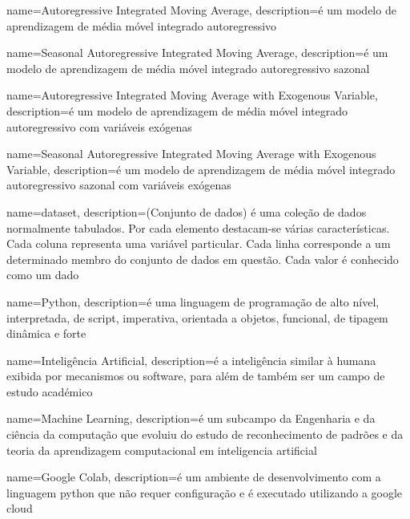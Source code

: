 {
    name={Autoregressive Integrated Moving Average},
    description={é um modelo de aprendizagem de média móvel integrado autoregressivo}
}

{
    name={Seasonal Autoregressive Integrated Moving Average},
    description={é um modelo de aprendizagem de média móvel integrado autoregressivo
    sazonal}
}

{
    name={Autoregressive Integrated Moving Average with Exogenous Variable},
    description={é um modelo de aprendizagem de média móvel integrado autoregressivo
    com variáveis exógenas}
}

{
    name={Seasonal Autoregressive Integrated Moving Average with Exogenous Variable},
    description={é um modelo de aprendizagem de média móvel integrado autoregressivo
    sazonal com variáveis exógenas}
}

{
    name={dataset},
    description={(Conjunto de dados) é uma coleção de dados normalmente tabulados. Por
    cada elemento destacam-se várias características. Cada coluna representa uma
    variável particular. Cada linha corresponde a um determinado membro do conjunto de
    dados em questão. Cada valor é conhecido como um dado}
}

{
    name={Python},
    description={é uma linguagem de programação de alto nível, interpretada, de script,
    imperativa, orientada a objetos, funcional, de tipagem dinâmica e forte}
}

{
    name={Inteligência Artificial},
    description={é a inteligência similar à humana exibida por mecanismos ou software,
    para além de também ser um campo de estudo académico}
}

{
    name={Machine Learning},
    description={é um subcampo da Engenharia e da ciência da computação que evoluiu do
    estudo de reconhecimento de padrões e da teoria da aprendizagem computacional em
    \gls{inteligencia artificial}}
}

{
    name={Google Colab},
    description={é um ambiente de desenvolvimento com a linguagem \gls{python} que não
    requer configuração e é executado utilizando a \gls{google cloud}}
}

